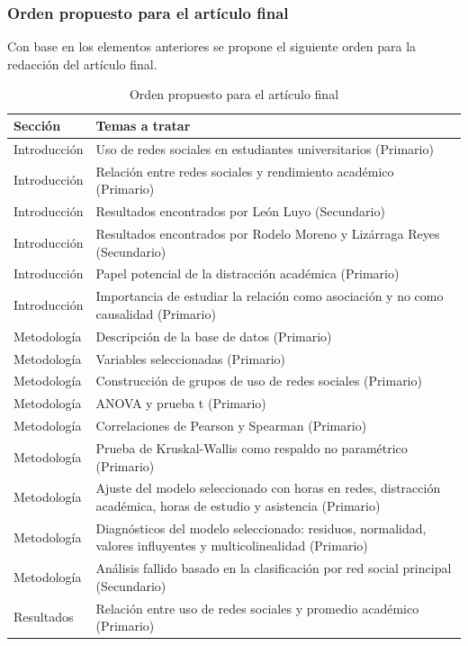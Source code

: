 \documentclass[12pt]{article}
\begin{document}
\subsubsection{Orden propuesto para el artículo final}
Con base en los elementos anteriores se propone el siguiente orden para la redacción del artículo final.

\begin{table}[H]
\centering
\caption{Orden propuesto para el artículo final}
\begin{tabular}{p{3cm} p{9cm}}
\toprule
\textbf{Sección} & \textbf{Temas a tratar} \\
\midrule
Introducción & Uso de redes sociales en estudiantes universitarios (Primario) \\
Introducción & Relación entre redes sociales y rendimiento académico (Primario) \\
Introducción & Resultados encontrados por León Luyo (Secundario) \\
Introducción & Resultados encontrados por Rodelo Moreno y Lizárraga Reyes (Secundario) \\
Introducción & Papel potencial de la distracción académica (Primario) \\
Introducción & Importancia de estudiar la relación como asociación y no como causalidad (Primario) \\
\midrule
Metodología & Descripción de la base de datos (Primario) \\
Metodología & Variables seleccionadas (Primario) \\
Metodología & Construcción de grupos de uso de redes sociales (Primario) \\
Metodología & ANOVA y prueba t (Primario) \\
Metodología & Correlaciones de Pearson y Spearman (Primario) \\
Metodología & Prueba de Kruskal-Wallis como respaldo no paramétrico (Primario) \\
Metodología & Ajuste del modelo seleccionado con horas en redes, distracción académica, horas de estudio y asistencia (Primario) \\
Metodología & Diagnósticos del modelo seleccionado: residuos, normalidad, valores influyentes y multicolinealidad (Primario) \\
Metodología & Análisis fallido basado en la clasificación por red social principal (Secundario) \\
\midrule
Resultados & Relación entre uso de redes sociales y promedio académico (Primario) \\

\end{tabular}
\end{table}
\end{document}
